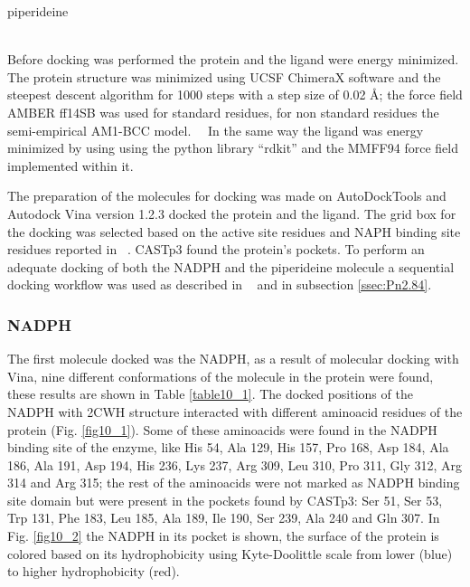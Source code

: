 \documentclass[12pt]{article}
\newcommand{\textcite}[1]{\citeauthor{#1}~\citeyear{#1}}
\begin{document}
	\vspace{-35pt}\hspace{81pt}
	\begin{minipage}{0.345\paperwidth}
		\centering
		piperideine
	\end{minipage}\\
	
	Before docking was performed the protein and the ligand were energy minimized. The protein structure was minimized using UCSF ChimeraX software \cite{chimera,chimera_2} and the steepest descent algorithm for 1000 steps with a step size of 0.02 \r{A}; the force field AMBER ff14SB was used for standard residues, for non standard residues the semi-empirical AM1-BCC model. \cite{am1_bcc,am1_bcc_2,am1_bcc_3}\ \ In the same way the ligand was energy minimized by using using the python library ``rdkit'' and the MMFF94 force field implemented within it. \cite{rdkit,rdkit_mmff}
	
	The preparation of the molecules for docking was made on AutoDockTools and Autodock Vina version 1.2.3 docked the protein and the ligand. \cite{adt,vina,vina_2} The grid box for the docking was selected based on the active site residues and NAPH binding site residues reported in \textcite{goto2005crystal}. CASTp3 found the protein's pockets. \cite{castp} To perform an adequate docking of both the NADPH and the piperideine molecule a sequential docking workflow was used as described in \textcite{sequential} and in subsection \ref{ssec:Pn2.84}.
	
	\subsubsection{NADPH}
	
	The first molecule docked was the NADPH, as a result of molecular docking with Vina, nine different conformations of the molecule in the protein were found, these results are shown in Table \ref{table10_1}. The docked positions of the NADPH with 2CWH structure interacted with different aminoacid residues of the protein (Fig. \ref{fig10_1}). Some of these aminoacids were found in the NADPH binding site of the enzyme, like His 54, Ala 129, His 157, Pro 168, Asp 184, Ala 186, Ala 191, Asp 194, His 236, Lys 237, Arg 309, Leu 310, Pro 311, Gly 312, Arg 314 and Arg 315; the rest of the aminoacids were not marked as NADPH binding site domain but were present in the pockets found by CASTp3: Ser 51, Ser 53, Trp 131, Phe 183, Leu 185, Ala 189, Ile 190, Ser 239, Ala 240 and Gln 307. In Fig. \ref{fig10_2} the NADPH in its pocket is shown, the surface of the protein is colored based on its hydrophobicity using Kyte-Doolittle scale from lower (blue) to higher hydrophobicity (red).
		
\end{document}
